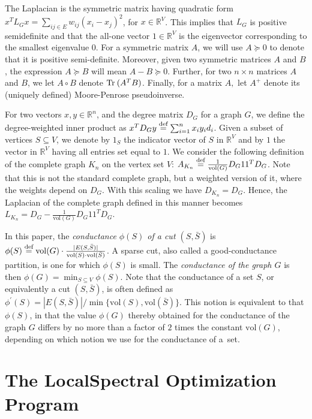 \documentclass[11pt]{article}
\newcommand{\defeq}{\stackrel{\textup{def}}{=}}
\newcommand{\vol}{\mathrm{vol}}
\begin{document}
The Laplacian is the symmetric matrix having quadratic form 
$x^T L_G x = \sum_{ij \in E} w_{ij} (x_i - x_j)^2$, for $x \in  \mathbb{R}^V$. 
This implies that $L_G$ is positive semidefinite and that the all-one vector 
$1 \in  \mathbb{R}^V$ is the eigenvector corresponding to the smallest 
eigenvalue $0$.
For a symmetric matrix $A$, we will use $A \succeq 0$ to denote that it is 
positive semi-definite.
Moreover, given two symmetric matrices $A$ and $B$, the expression 
$A \succeq B$ will mean $A - B \succeq 0$.
Further, for two $n\times n$ matrices $A$ and $B$, we let $A \circ B$ 
denote ${\rm Tr}\:(A^TB)$. 
Finally, for a matrix $A,$ let $A^{+}$ denote its (uniquely defined) 
Moore-Penrose pseudoinverse.

For two vectors $x,y \in \mathbb{R}^{n}$, and the degree matrix $D_G$ for a 
graph $G$, we define the degree-weighted inner product as
$ x^T D_G y \defeq  \sum_{i=1}^{n} x_{i}y_{i}d_{i}$.
Given a subset of vertices $S \subseteq V$, we denote by $1_S$ the indicator 
vector of $S$ in $\mathbb{R}^V$ and by $1$ the vector in $\mathbb{R}^V$ 
having all entries set equal to $1$.
We consider the following definition of the complete graph $K_n$ on the 
vertex set $V$: $ A_{K_n} \defeq  \frac{1}{\vol(G)} D_G 11^T D_G$.
Note that this is not the standard complete graph, but a weighted version of 
it, where the weights depend on $D_G$.
With this scaling we have $D_{K_n} = D_G$.
Hence, the Laplacian of the complete graph defined in this manner becomes
$ L_{K_n} = D_G - \frac{1}{\vol(G)} D_G 11^T D_G $.

In this paper, the \emph{conductance $\phi(S)$ of a cut $(S,\bar{S})$} is 
$\phi(S) \defeq \vol(G) \cdot \frac{|E(S,\bar{S})|}{\vol(S)\cdot\vol(\bar{S})}$.
A sparse cut, also called a good-conductance partition, is one for which 
$\phi(S)$ is small.
The \emph{conductance of the graph $G$} is then
$\phi(G)=\min_{S \subseteq V} \phi(S)$.
Note that the conductance of a set $S$, or equivalently a cut $(S,\bar{S})$, is often 
defined as $\phi^\prime(S)=|E(S,\bar{S})|/\min\{\vol(S),\vol(\bar{S})\}$. 
This notion is equivalent to that $\phi(S)$, in that the value 
$\phi(G)$ thereby obtained for the conductance of the graph $G$ differs by 
no more than a factor of $2$ times the constant $\vol(G)$, depending on 
which notion we use for the conductance of a~set.  



\section{The \textsf{LocalSpectral} Optimization Program}
\label{sxn:optimize}
\end{document}
